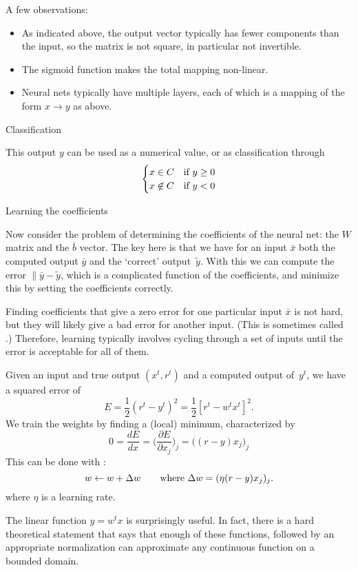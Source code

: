 A few observations:
\begin{itemize}
\item
  As indicated above, the output vector typically has fewer components
  than the input, so the matrix is not square, in particular not
  invertible.
\item The sigmoid function makes the total mapping non-linear.
\item Neural nets typically have multiple layers, each of which is a
  mapping of the form $x\rightarrow y$ as above.
\end{itemize}

 {Classification}

This output $y$ can be used as a numerical value,
or as classification through
\[ 
\begin{cases}
  x\in C &\hbox{if $y\geq 0$}\\
  x\not\in C&\hbox{if $y<0$}\\
\end{cases}
\]

 {Learning the coefficients}

Now consider the problem of determining the coefficients of the neural
net: the $W$ matrix and the $\bar b$ vector. The key here is that we have
for an input $\bar x$ both the computed output $\bar y$ and the
`correct' output~$\tilde y$. With this we can compute the error
$\|\bar y -\tilde y$, which is a complicated function of the
coefficients, and minimize this by setting the coefficients correctly.

Finding coefficients that give a zero error for one particular input
$\bar x$ is not hard, but they will likely give a bad error for
another input. (This is sometimes called .)
Therefore, learning typically involves cycling through a set of inputs
until the error is acceptable for all of them.

Given an input and true output $(x^t,r^t)$ and a computed output
of~$y^t$, we have a squared error of
\[ E = \frac12 (r^t-y^t)^2 = \frac12 \left[r^t- w^tx^t\right]^2. \]
We train the weights
by finding a (local) minimum, characterized by
\[ 0=\frac{d E}{d x} = \bigl( \frac{\partial E}{\partial x_j} \bigr)_j
    = \bigl( (r-y)x_j \bigr)_j \]
This can be done with :
\[ w\leftarrow w+\Delta w \qquad
    \hbox{where $\Delta w=( \eta(r-y)x_j )_j$}. \]
where $\eta$ is a learning rate.


The linear function $y=w^tx$ is surprisingly useful. In fact, there is
a hard theoretical statement that says that enough of these functions,
followed by an appropriate normalization can approximate any
continuous function on a bounded domain.

